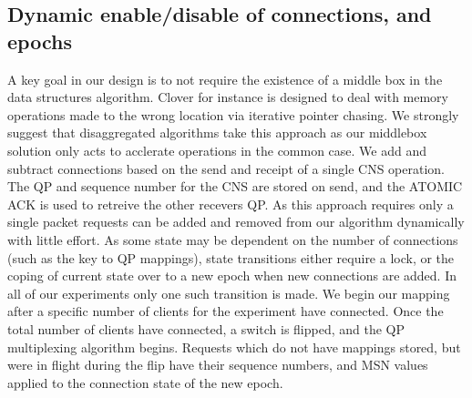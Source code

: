 \subsection{Dynamic enable/disable of connections, and epochs} A key goal in our
design is to not require the existence of a middle box in the data structures
algorithm. Clover for instance is designed to deal with memory operations made
to the wrong location via iterative pointer chasing. We strongly suggest that
disaggregated algorithms take this approach as our middlebox solution only acts
to acclerate operations in the common case. We add and subtract connections
based on the send and receipt of a single CNS operation. The QP and sequence
number for the CNS are stored on send, and the ATOMIC ACK is used to retreive
the other recevers QP. As this approach requires only a single packet requests
can be added and removed from our algorithm dynamically with little effort. As
some state may be dependent on the number of connections (such as the key to QP
mappings), state transitions either require a lock, or the coping of current
state over to a new epoch when new connections are added. In all of our
experiments only one such transition is made. We begin our mapping after a
specific number of clients for the experiment have connected. Once the total
number of clients have connected, a switch is flipped, and the QP multiplexing
algorithm begins. Requests which do not have mappings stored, but were in flight
during the flip have their sequence numbers, and MSN values applied to the
connection state of the new epoch.

